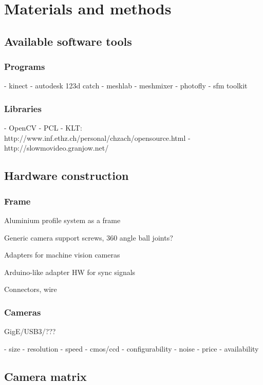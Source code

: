 \section{Materials and methods}

\subsection{Available software tools}

\subsubsection{Programs}

- kinect
- autodesk 123d catch
- meshlab
- meshmixer
- photofly
- sfm toolkit

\subsubsection{Libraries}

- OpenCV
- PCL
- KLT: http://www.inf.ethz.ch/personal/chzach/opensource.html
- http://slowmovideo.granjow.net/


\subsection{Hardware construction}

\subsubsection{Frame}

Aluminium profile system as a frame

Generic camera support screws, 360 angle ball joints?

Adapters for machine vision cameras

Arduino-like adapter HW for sync signals

Connectors, wire

\subsubsection{Cameras}

GigE/USB3/???

- size
- resolution
- speed
- cmos/ccd
- configurability
- noise
- price
- availability

\subsection{Camera matrix}

